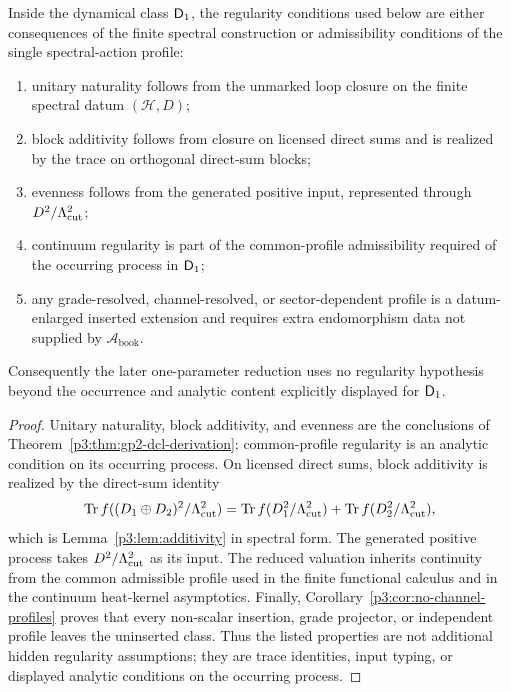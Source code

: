 \documentclass[12pt,a4paper]{article}
\begin{document}
\begin{theorem}
\label{p3:thm:no_residual_regularity_D1}
Inside the dynamical class \(\mathsf{D}_1\), the regularity conditions used below are either consequences of the finite spectral construction or admissibility
conditions of the single spectral-action profile:
\begin{enumerate}[label=(\roman*),leftmargin=2.1em]
\item unitary naturality follows from the unmarked loop closure on the finite
spectral datum \((\mathcal H,D)\);
\item block additivity follows from closure on licensed direct sums and is realized by
the trace on orthogonal direct-sum blocks;
\item evenness follows from the generated positive input, represented through
\(D^2/\Lambda_{\mathrm{cut}}^2\);
\item continuum regularity is part of the common-profile admissibility
required of the occurring process in \(\mathsf{D}_1\);
\item any grade-resolved, channel-resolved, or sector-dependent profile is a datum-enlarged inserted
extension and requires extra endomorphism data not supplied by \(\mathcal A_{\mathrm{book}}\).
\end{enumerate}
Consequently the later one-parameter reduction uses no regularity hypothesis
beyond the occurrence and analytic content explicitly displayed for \(\mathsf{D}_1\).
\end{theorem}

\begin{proof}
Unitary naturality, block additivity, and evenness are the conclusions of
Theorem~\ref{p3:thm:gp2-dcl-derivation}; common-profile regularity is an
analytic condition on its occurring process.  On licensed direct sums,
block additivity is realized by the direct-sum identity
\[
        \operatorname{Tr} f((D_1\oplus D_2)^2/\Lambda_{\mathrm{cut}}^2)
        =\operatorname{Tr} f(D_1^2/\Lambda_{\mathrm{cut}}^2)+\operatorname{Tr} f(D_2^2/\Lambda_{\mathrm{cut}}^2),
\]
which is Lemma~\ref{p3:lem:additivity} in spectral form.  The generated
positive process takes \(D^2/\Lambda_{\mathrm{cut}}^2\) as its input.
The reduced valuation inherits continuity from the common admissible profile used in the finite
functional calculus and in the continuum heat-kernel asymptotics.  Finally,
Corollary~\ref{p3:cor:no-channel-profiles} proves that every non-scalar insertion, grade
projector, or independent profile leaves the uninserted class.  Thus the listed properties are not
additional hidden regularity assumptions; they are trace identities, input
typing, or displayed analytic conditions on the occurring process.
\end{proof}
\end{document}
